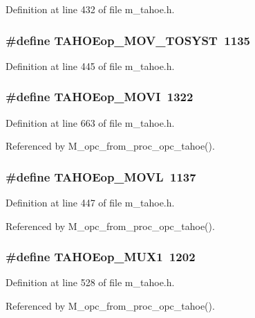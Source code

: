 Definition at line 432 of file m\_\-tahoe.h.
\subsubsection{\setlength{\rightskip}{0pt plus 5cm}\#define TAHOEop\_\-MOV\_\-TOSYST~1135}\label{m__tahoe_8h_6f4fcf593fd1c4725e4c411e3e0561ac}




Definition at line 445 of file m\_\-tahoe.h.
\subsubsection{\setlength{\rightskip}{0pt plus 5cm}\#define TAHOEop\_\-MOVI~1322}\label{m__tahoe_8h_5a2e74c0d2dbe5ae8b2e8def3fa18506}




Definition at line 663 of file m\_\-tahoe.h.

Referenced by M\_\-opc\_\-from\_\-proc\_\-opc\_\-tahoe().
\subsubsection{\setlength{\rightskip}{0pt plus 5cm}\#define TAHOEop\_\-MOVL~1137}\label{m__tahoe_8h_208f909a06708470c507f592305bee5d}




Definition at line 447 of file m\_\-tahoe.h.

Referenced by M\_\-opc\_\-from\_\-proc\_\-opc\_\-tahoe().
\subsubsection{\setlength{\rightskip}{0pt plus 5cm}\#define TAHOEop\_\-MUX1~1202}\label{m__tahoe_8h_68bb9b5bd4a88cf488678f41569a4fc5}




Definition at line 528 of file m\_\-tahoe.h.

Referenced by M\_\-opc\_\-from\_\-proc\_\-opc\_\-tahoe().
